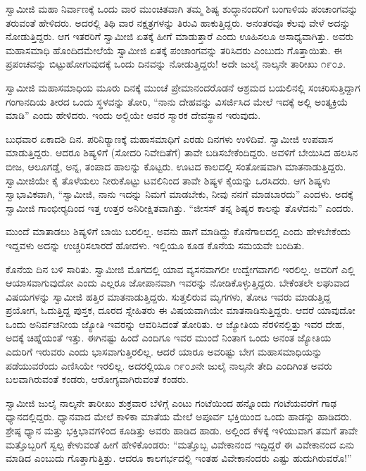  ಸ್ವಾಮೀಜಿ ಮಹಾ ನಿರ್ವಾಣಕ್ಕೆ ಒಂದು ವಾರ ಮುಂಚಿತವಾಗಿ ತಮ್ಮ ಶಿಷ್ಯ ಶುದ್ಧಾನಂದರಿಗೆ ಬಂಗಾಳಿಯ ಪಂಚಾಂಗವನ್ನು ತರುವಂತೆ ಹೇಳಿದರು. ಅದರಲ್ಲಿ ತಿಥಿ ವಾರ ನಕ್ಷತ್ರಗಳನ್ನು ತಿರುವಿ ಹಾಕುತ್ತಿದ್ದರು. ಅನಂತರವೂ ಕೆಲವು ವೇಳೆ ಅದನ್ನು ನೋಡುತ್ತಿದ್ದರು. ಆಗ ಇತರರಿಗೆ ಸ್ವಾಮೀಜಿ ಏತಕ್ಕೆ ಹೀಗೆ ಮಾಡುತ್ತಾರೆ ಎಂದು ಊಹಿಸಲೂ ಅಸಾಧ್ಯವಾಗಿತ್ತು. ಅವರು ಮಹಾಸಮಾಧಿ ಹೊಂದಿದಮೇಲೆಯೆ ಸ್ವಾಮೀಜಿ ಏತಕ್ಕೆ ಪಂಚಾಂಗವನ್ನು ತರಿಸಿದರು ಎಂಬುದು ಗೊತ್ತಾಯಿತು. ಈ ಪ್ರಪಂಚವನ್ನು ಬಿಟ್ಟುಹೋಗುವುದಕ್ಕೆ ಒಂದು ದಿನವನ್ನು ನೋಡುತ್ತಿದ್ದರು! ಅದೇ ಜುಲೈ ನಾಲ್ಕನೇ ತಾರೀಖು ೧೯೦೨. 

 ಸ್ವಾಮೀಜಿ ಮಹಾಸಮಾಧಿಯ ಮೂರು ದಿನಕ್ಕೆ ಮುಂಚೆ ಪ್ರೇಮಾನಂದರೊಡನೆ ಆಶ್ರಮದ ಬಯಲಿನಲ್ಲಿ ಸಂಚರಿಸುತ್ತಿದ್ದಾಗ ಗಂಗಾನದಿಯ ತೀರದ ಒಂದು ಸ್ಥಳವನ್ನು ತೋರಿ, “ನಾನು ದೇಹವನ್ನು ವಿಸರ್ಜಿಸಿದ ಮೇಲೆ ಇದಕ್ಕೆ ಅಲ್ಲಿ ಅಂತ್ಯಕ್ರಿಯೆ ಮಾಡಿ” ಎಂದು ಹೇಳಿದರು. ಇಂದು ಅಲ್ಲಿಯೇ ಅವರ ಸ್ಮಾರಕ ದೇವಸ್ಥಾನ ಇರುವುದು. 

 ಬುಧವಾರ ಏಕಾದಶಿ ದಿನ. ಪರಿನಿರ‍್ಯಾಣಕ್ಕೆ ಮಹಾಸಮಾಧಿಗೆ ಎರಡು ದಿನಗಳು ಉಳಿದಿವೆ. ಸ್ವಾಮೀಜಿ ಉಪವಾಸ ಮಾಡುತ್ತಿದ್ದರು. ಆದರೂ ಶಿಷ್ಯಳಿಗೆ (ಸೋದರಿ ನಿವೇದಿತೆಗೆ) ತಾವೇ ಬಡಿಸಬೇಕೆಂದಿದ್ದರು. ಅವಳಿಗೆ ಬೇಯಿಸಿದ ಹಲಸಿನ ಬೀಜ, ಆಲೂಗಡ್ಡೆ, ಅನ್ನ, ತಂಪಾದ ಹಾಲನ್ನು ಕೊಟ್ಟರು. ಊಟದ ಕಾಲದಲ್ಲಿ ಸಂತೋಷವಾಗಿ ಮಾತನಾಡುತ್ತಿದ್ದರು. ಸ್ವಾಮೀಜಿಯೇ ಕೈ ತೊಳೆಯಲು ನೀರುಕೊಟ್ಟು ಟವಲಿನಿಂದ ತಾವೇ ಶಿಷ್ಯಳ ಕೈಯನ್ನು ಒರಸಿದರು. ಆಗ ಶಿಷ್ಯಳು ಸ್ವಾಭಾವಿಕವಾಗಿ, “ಸ್ವಾಮೀಜಿ, ನಾನು ಇದನ್ನು ನಿಮಗೆ ಮಾಡಬೇಕು, ನೀವು ನನಗೆ ಮಾಡಬಾರದು” ಎಂದಳು. ಅದಕ್ಕೆ ಸ್ವಾಮೀಜಿ ಗಾಂಭೀರ‍್ಯದಿಂದ ಇತ್ತ ಉತ್ತರ ಅನಿರೀಕ್ಷಿತವಾಗಿತ್ತು. “ಜೀಸಸ್ ತನ್ನ ಶಿಷ್ಯರ ಕಾಲನ್ನು ತೊಳೆದನು” ಎಂದರು. 

 ಮುಂದೆ ಮಾತಾಡಲು ಶಿಷ್ಯಳಿಗೆ ಬಾಯಿ ಬರಲಿಲ್ಲ. ಅವನು ಹಾಗೆ ಮಾಡಿದ್ದು ಕೊನೆಗಾಲದಲ್ಲಿ ಎಂದು ಹೇಳಬೇಕೆಂದು ಇದ್ದವಳು ಅದನ್ನು ಉಚ್ಚರಿಸಲಾರದೆ ಹೋದಳು. ಇಲ್ಲಿಯೂ ಕೂಡ ಕೊನೆಯ ಸಮಯವೇ ಬಂದಿತು. 

 ಕೊನೆಯ ದಿನ ಬಳಿ ಸಾರಿತು. ಸ್ವಾಮೀಜಿ ಮೊಗದಲ್ಲಿ ಯಾವ ವ್ಯಸನವಾಗಲೀ ಉದ್ವೇಗವಾಗಲಿ ಇರಲಿಲ್ಲ. ಅವರಿಗೆ ಎಲ್ಲಿ ಆಯಾಸವಾಗುವುದೋ ಎಂದು ಎಲ್ಲರೂ ಜೋಪಾನವಾಗಿ ಇವರನ್ನು ನೋಡಿಕೊಳ್ಳುತ್ತಿದ್ದರು. ಬೇಕೆಂತಲೇ ಲಘುವಾದ ವಿಷಯಗಳನ್ನು ಸ್ವಾಮೀಜಿ ಹತ್ತಿರ ಮಾತನಾಡುತ್ತಿದ್ದರು. ಸುತ್ತಲಿರುವ ಮೃಗಗಳು, ತೋಟ ಇವರು ಮಾಡುತ್ತಿದ್ದ ಪ್ರಯೋಗ, ಓದುತ್ತಿದ್ದ ಪುಸ್ತಕ, ದೂರದ ಸ್ನೇಹಿತರು ಈ ವಿಷಯವಾಗಿಯೇ ಮಾತನಾಡಿಸುತ್ತಿದ್ದರು. ಆದರೆ ಯಾವುದೋ ಒಂದು ಅನಿರ್ವಚನೀಯ ಜ್ಯೋತಿ ಇವರನ್ನು ಆವರಿಸಿದಂತೆ ತೋರಿತು. ಆ ಜ್ಯೋತಿಯ ನೆರಳಿನಲ್ಲಿತ್ತು ಇವರ ದೇಹ, ಅದಕ್ಕೆ ಚಿಹ್ನೆಯಂತೆ ಇತ್ತು. ಈಗಿನಷ್ಟು ಹಿಂದೆ ಎಂದಿಗೂ ಇವರ ಮುಂದೆ ನಿಂತಾಗ ಒಂದು ಅನಂತ ಜ್ಯೋತಿಯ ಎದುರಿಗೆ ಇರುವರು ಎಂದು ಭಾಸವಾಗುತ್ತಿರಲಿಲ್ಲ. ಆದರೆ ಯಾರೂ ಅವರಿಷ್ಟು ಬೇಗ ಮಹಾಸಮಾಧಿಯನ್ನು ಪಡೆಯುವರೆಂದು ಎಣಿಸಿಯೇ ಇರಲಿಲ್ಲ. ಅದರಲ್ಲಿಯೂ ೧೯೦೨ನೇ ಜುಲೈ ನಾಲ್ಕನೇ ತೇದಿ ಎಂದಿಗಿಂತ ಅವರು ಬಲವಾಗಿರುವಂತೆ ಕಂಡರು, ಆರೋಗ್ಯವಾಗಿರುವಂತೆ ಕಂಡರು. 

 ಸ್ವಾಮೀಜಿ ಜುಲೈ ನಾಲ್ಕನೇ ತಾರೀಖು ಶುಕ್ರವಾರ ಬೆಳಿಗ್ಗೆ ಎಂಟು ಗಂಟೆಯಿಂದ ಹನ್ನೊಂದು ಗಂಟೆಯವರೆಗೆ ಗಾಢ ಧ್ಯಾನದಲ್ಲಿದ್ದರು. ಧ್ಯಾನವಾದ ಮೇಲೆ ಕಾಳಿಕಾ ಮಾತೆಯ ಮೇಲೆ ಅಪೂರ್ವ ಭಕ್ತಿಯಿಂದ ಒಂದು ಹಾಡನ್ನು ಹಾಡಿದರು. ಶ್ರೇಷ್ಠ ಧ್ಯಾನ ಮತ್ತು ಭಕ್ತಿಭಾವಗಳಿಂದ ಕೂಡಿತ್ತು ಅವರು ಹಾಡಿದ ಹಾಡು. ಅಲ್ಲಿಂದ ಕೆಳಕ್ಕೆ ಇಳಿಯುವಾಗ ತಮಗೆ ತಾವೇ ಮತ್ತೊಬ್ಬರಿಗೆ ಸ್ವಲ್ಪ ಕೇಳುವಂತೆ ಹೀಗೆ ಹೇಳಿಕೊಂಡರು: “ಮತ್ತೊಬ್ಬ ವಿವೇಕಾನಂದ ಇದ್ದಿದ್ದರೆ ಈ ವಿವೇಕಾನಂದ ಏನು ಮಾಡಿದ ಎಂಬುದು ಗೊತ್ತಾಗುತ್ತಿತ್ತು. ಆದರೂ ಕಾಲಗರ್ಭದಲ್ಲಿ ಇಂತಹ ವಿವೇಕಾನಂದರು ಎಷ್ಟು ಹುದುಗಿರುವರೊ!” 

